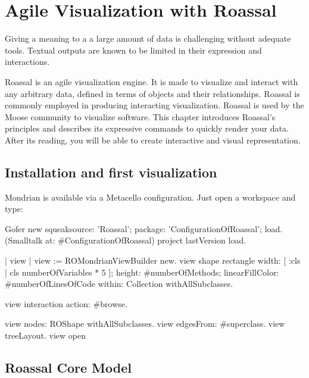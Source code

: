 \documentclass[a4paper,10pt,twoside]{book}
\begin{document}
\fi
\sloppy
\chapter{Agile Visualization with Roassal}


Giving a meaning to a a large amount of data is challenging without adequate tools. Textual outputs are known to be limited in their expression and interactions. 

Roassal is an agile visualization engine. It is made to visualize and interact with any arbitrary data, defined in terms of objects and their relationships. Roassal is commonly employed in producing interacting  visualization. Roassal is used by the Moose community to visualize software. This chapter introduces Roassal's principles and describes its expressive commands to quickly render your data. After its reading, you will be able to create interactive and visual representation.

\section{Installation and first visualization}

Mondrian is available via a Metacello configuration. Just open a workspace and type:
\begin{code}{}
Gofer new
	squeaksource: 'Roassal'; 
	package: 'ConfigurationOfRoassal';
	load.
(Smalltalk at: #ConfigurationOfRoassal) project lastVersion load.
\end{code}


\begin{code}{}
| view |
view := ROMondrianViewBuilder new.
view shape rectangle 
	width:  [ :cls | cls numberOfVariables * 5 ];  
	height: #numberOfMethods;
	linearFillColor: #numberOfLinesOfCode within:  Collection withAllSubclasses.
		
view interaction action: #browse.

view nodes: ROShape withAllSubclasses.
view edgesFrom: #superclass.
view treeLayout.
view open
\end{code}


\section{Roassal Core Model}
\end{document}
